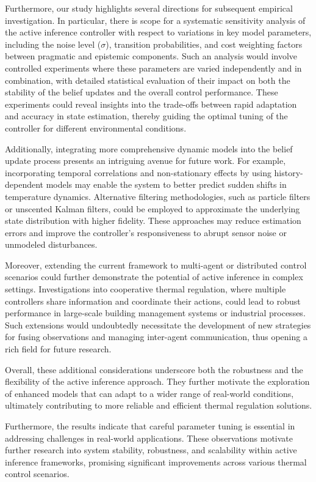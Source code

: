 \documentclass[11pt]{article}
\begin{document}
Furthermore, our study highlights several directions for subsequent empirical investigation. In particular, there is scope for a systematic sensitivity analysis of the active inference controller with respect to variations in key model parameters, including the noise level (\(\sigma\)), transition probabilities, and cost weighting factors between pragmatic and epistemic components. Such an analysis would involve controlled experiments where these parameters are varied independently and in combination, with detailed statistical evaluation of their impact on both the stability of the belief updates and the overall control performance. These experiments could reveal insights into the trade-offs between rapid adaptation and accuracy in state estimation, thereby guiding the optimal tuning of the controller for different environmental conditions.

Additionally, integrating more comprehensive dynamic models into the belief update process presents an intriguing avenue for future work. For example, incorporating temporal correlations and non-stationary effects by using history-dependent models may enable the system to better predict sudden shifts in temperature dynamics. Alternative filtering methodologies, such as particle filters or unscented Kalman filters, could be employed to approximate the underlying state distribution with higher fidelity. These approaches may reduce estimation errors and improve the controller’s responsiveness to abrupt sensor noise or unmodeled disturbances.

Moreover, extending the current framework to multi-agent or distributed control scenarios could further demonstrate the potential of active inference in complex settings. Investigations into cooperative thermal regulation, where multiple controllers share information and coordinate their actions, could lead to robust performance in large-scale building management systems or industrial processes. Such extensions would undoubtedly necessitate the development of new strategies for fusing observations and managing inter-agent communication, thus opening a rich field for future research.

Overall, these additional considerations underscore both the robustness and the flexibility of the active inference approach. They further motivate the exploration of enhanced models that can adapt to a wider range of real-world conditions, ultimately contributing to more reliable and efficient thermal regulation solutions.

Furthermore, the results indicate that careful parameter tuning is essential in addressing challenges in real-world applications. These observations motivate further research into system stability, robustness, and scalability within active inference frameworks, promising significant improvements across various thermal control scenarios.


\end{document}
